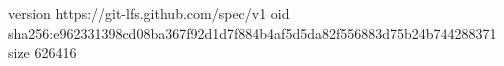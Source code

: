 version https://git-lfs.github.com/spec/v1
oid sha256:e962331398cd08ba367f92d1d7f884b4af5d5da82f556883d75b24b744288371
size 626416
